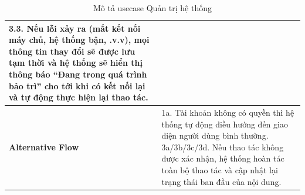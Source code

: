 \documentclass[a4paper]{article}
\begin{document}
\begin{table}[h!]
\begin{tabularx}{\textwidth}{|l|X|}
  3.3. Nếu lỗi xảy ra (mất kết nối máy chủ, hệ thống bận, .v.v), mọi thông tin thay đổi sẽ được lưu tạm thời và hệ thống sẽ hiển thị thông báo ``Đang trong quá trình bảo trì'' cho tới khi có kết nối lại và tự động thực hiện lại thao tác. \\ \hline
\textbf{Alternative Flow} 
& 1a. Tài khoản không có quyền thì hệ thống tự động điều hướng đến giao diện người dùng bình thường. \newline
  3a/3b/3c/3d. Nếu thao tác không được xác nhận, hệ thống hoàn tác toàn bộ thao tác và cập nhật lại trạng thái ban đầu của nội dung. \\ \hline
\end{tabularx}
\caption{Mô tả usecase Quản trị hệ thống}
\end{table}
\end{document}
